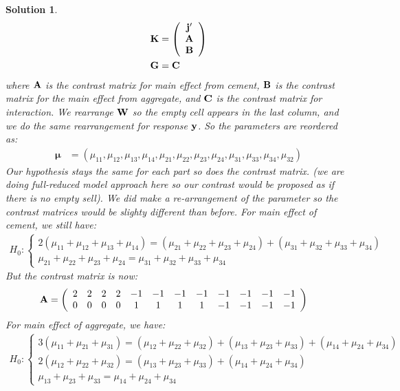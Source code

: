 \documentclass[11pt]{article}
\newtheorem{sol}{Solution}
\begin{document}
\begin{sol}
	\begin{align*}
		{\bf K} &= \left(\begin{array}{c} {\bf j}'\\ {\bf A}\\ {\bf B}\end{array}\right)\\
		{\bf G} &= {\bf C}
	\end{align*}
	where ${\bf A}$ is the contrast matrix for main effect from cement, ${\bf B}$ is the contrast matrix for the main effect from aggregate, and ${\bf C}$ is the contrast matrix for interaction.\vskip 2mm
	We rearrange ${\bf W}$ so the empty cell appears in the last column, and we do the same rearrangement for response ${\bf y}$.\vskip 2mm
	So the parameters are reordered as:
	\begin{align*}
		{\bm \mu} &= (\mu_{11}, \mu_{12}, \mu_{13}, \mu_{14}, \mu_{21}, \mu_{22}, \mu_{23}, \mu_{24}, \mu_{31}, \mu_{33}, \mu_{34}, \mu_{32})
	\end{align*}
	Our hypothesis stays the same for each part so does the contrast matrix. (we are doing full-reduced model approach here so our contrast would be proposed as if there is no empty sell). We did make a re-arrangement of the parameter so the contrast matrices would be slighty different than before.
	For main effect of cement, we still have:
	\begin{align*}
		H_0:  \left \{\begin{array}{l}2(\mu_{11} + \mu_{12} + \mu_{13} + \mu_{14}) = (\mu_{21} + \mu_{22} + \mu_{23} + \mu_{24}) + (\mu_{31} + \mu_{32} + \mu_{33} + \mu_{34}) \\ \mu_{21} + \mu_{22} + \mu_{23} + \mu_{24} = \mu_{31} + \mu_{32} + \mu_{33} + \mu_{34} \end{array}\right.
	\end{align*}
	But the contrast matrix is now:
	\begin{align*}
		{\bf A} &= \left(\begin{array}{cccccccccccc} 2&2&2&2&-1&-1&-1&-1&-1&-1&-1&-1\\ 0 &0&0&0&1&1&1&1&-1&-1&-1&-1\end{array}\right)
	\end{align*}
	For main effect of aggregate, we have:
	\begin{align*}
		H_0: \left\{\begin{array}{l} 3(\mu_{11} + \mu_{21} + \mu_{31}) = (\mu_{12} + \mu_{22} + \mu_{32}) + (\mu_{13} + \mu_{23} + \mu_{33}) + (\mu_{14} + \mu_{24} + \mu_{34})\\ 2(\mu_{12} + \mu_{22} + \mu_{32}) = (\mu_{13} + \mu_{23} + \mu_{33}) + (\mu_{14} + \mu_{24} + \mu_{34})\\ \mu_{13} + \mu_{23} + \mu_{33} = \mu_{14} + \mu_{24} + \mu_{34}\end{array}\right.

\end{align*}
\end{sol}
\end{document}
